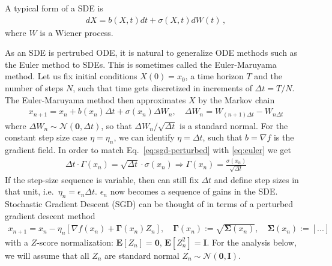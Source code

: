 \documentclass{article}
\newcommand{\E}{{\mathbf E}}
\newcommand{\mSigma}{{\mathbf \Sigma}}
\newcommand{\mGamma}{{\mathbf \Gamma}}
\newcommand{\mI}{{\mathbf I}}
\begin{document}
\newpage



A typical form of a SDE is 
\begin{align}
dX = b(X,t) dt + \sigma(X,t) dW(t)\,,
\end{align}
where $W$ is a Wiener process. 




\newpage

\newpage
As an SDE is pertrubed ODE, it is natural to generalize ODE methods such as the Euler method to SDEs. This is sometimes called the Euler-Maruyama method. Let us fix initial conditions $X(0) = x_0$, a time horizon $T$ and the number of steps $N$, such that time gets discretized in increments of $\Delta t = T/N$. The Euler-Maruyama method then approximates $X$ by the Markov chain 
\begin{align}
x_{n+1} = x_n + b(x_n) \Delta t   + \sigma(x_n) \Delta W_n, \quad \Delta W_{n}=W_{(n+1)\Delta t}-W_{n \Delta t}
\label{eq:euler}
\end{align} 
where $\Delta W_n \sim \mathcal N(\mathbf 0, \Delta t)$, so that $\Delta W_n/ \sqrt{\Delta t}$ is a standard normal. For the constant step size case $\eta = \eta_n$, we can identify $\eta = \Delta t$, such that $b = \nabla f$ is the gradient field. In order to match Eq.~\eqref{eq:sgd-perturbed} with \eqref{eq:euler}  we get 
\begin{align}
\Delta t \cdot \Gamma(x_n) = \sqrt{\Delta t} \cdot \sigma(x_n)  \Rightarrow \Gamma(x_n)  = \frac{\sigma(x_n)}{\sqrt{\Delta t}}
\end{align}
If the step-size sequence is variable, then can still fix $\Delta t$ and define step sizes in that unit, i.e.~$\eta_n = \epsilon_n \Delta t$. $\epsilon_n$ now becomes a sequence of gains in the SDE. \\


Stochastic Gradient Descent (SGD) can be thought of in terms of a perturbed gradient descent method
\begin{align}
x_{n+1}= x_n - \eta_n \left[ \nabla f(x_n) + \mGamma(x_n) Z_n \right],  \quad 
	\mGamma(x_n) := \sqrt{\mSigma(x_n)}, \quad 
	\mSigma(x_n) := [...]		
\label{eq:sgd-perturbed}
\end{align}
with a  $Z$-score normalization: $\E[Z_n]=\mathbf 0$, $\E[Z_n^2]=\mI$. For the analysis below, we will assume that all $Z_n$ are standard normal $Z_n \sim \mathcal N(\mathbf 0, \mI)$. \\
\end{document}
